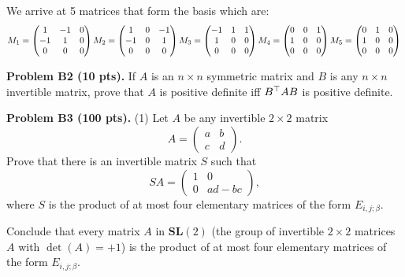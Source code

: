 \documentclass[12pt]{article}
\begin{document}
We arrive at 5 matrices that form the basis which are:
$$M_1 = \begin{pmatrix} 1 & -1 & 0 \\ -1 & 1 & 0\\ 0 & 0 & 0 \end{pmatrix} \\
M_2 = \begin{pmatrix} 1 & 0 & -1 \\ -1 & 0 & 1\\ 0 & 0 & 0 \end{pmatrix} \\
M_3 = \begin{pmatrix} -1 & 1 & 1 \\ 1 & 0 & 0\\ 0 & 0 & 0 \end{pmatrix}\\
M_4 = \begin{pmatrix} 0 & 0 & 1 \\ 1 & 0 & 0\\ 0 & 0 & 0 \end{pmatrix}\\
M_5 = \begin{pmatrix} 0 & 1 & 0 \\ 1 & 0 & 0\\ 0 & 0 & 0 \end{pmatrix}\\
$$


\vspace {0.25cm}\noindent
{\bf Problem B2 (10 pts).}
If $A$ is an $n\times n$ symmetric matrix and $B$ is any 
$n\times n$ invertible matrix, prove that $A$ is positive definite
iff $B^{\top} A B$ is positive definite.



\vspace {0.25cm}\noindent
{\bf Problem B3 (100 pts).}
(1)
Let $A$ be any invertible $2\times 2$ matrix
\[
A = 
\begin{pmatrix}
a & b \\
c & d
\end{pmatrix}.
\]
Prove that there is an invertible matrix $S$ such that
\[
SA = 
\begin{pmatrix}
1 & 0 \\
0 & ad - bc
\end{pmatrix},
\]
where $S$ is the product of at most four elementary matrices
of the form $E_{i, j; \beta}$.

\medskip
Conclude that every matrix $A$ in $\mathbf{SL}(2)$ 
(the group of invertible $2\times 2$ matrices $A$ with
$\det(A) = +1$)  is the product of
at most four elementary matrices
of the form $E_{i, j; \beta}$.
\end{document}
